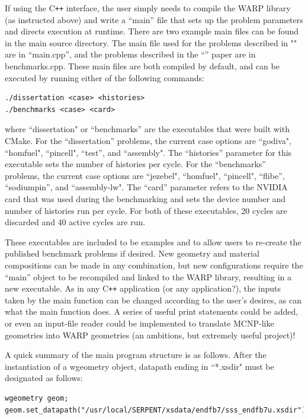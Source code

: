 \documentclass[twoside,a4paper]{refart}
\begin{document}
If using the C\texttt{++} interface, the user simply needs to compile the WARP library (as instructed above) and 
write a ``main'' file that sets up the problem parameters and directs execution at runtime.  There are two example main files can be found in the main source directory. The main file used for the problems described in "" are in ``main.cpp'', and the problems described in the ``'' paper are in benchmarks.cpp.  These main files are both compiled by default, and can be executed by running either of the following commands:

\begin{verbatim}
./dissertation <case> <histories>
./benchmarks <case> <card>
\end{verbatim}

where ``dissertation" or ``benchmarks'' are the executables that were built with CMake.  For the ``dissertation'' problems, the current case options are ``godiva",
``homfuel", ``pincell", ``test'', and ``assembly".  The ``histories'' parameter for this executable sets the number of histories per cycle. For the ``benchmarks'' problems, the current case options are ``jezebel", ``homfuel", ``pincell", ``flibe'', ``sodiumpin'', and ``assembly-lw".   The ``card'' parameter refers to the NVIDIA card that was used during the benchmarking and sets the device number and number of histories run per cycle.  For both of these executables, 20 cycles are discarded and 40 active cycles are run.

These executables are included to be examples and to allow users to re-create the published benchmark problems if desired.  New geometry and material compositions can be made in any combination, but new configurations require the ``main'' object to be recompiled and linked to the WARP library, resulting in a new executable.  As in any C\texttt{++}  application (or any application?), the inputs taken by the main function can be changed according to the user's desires, as can what the main function does.  A series of useful print statements could be added, or even an input-file reader could be implemented to translate MCNP-like geometries into WARP geometries (an ambitions, but extremely useful project)!

A quick summary of the main program structure is as follows.  After the instantiation of a wgeometry object, datapath ending in ``*.xsdir" must be designated as follows:

\begin{verbatim}
wgeometry geom;
geom.set_datapath("/usr/local/SERPENT/xsdata/endfb7/sss_endfb7u.xsdir");
\end{verbatim}
\end{document}
